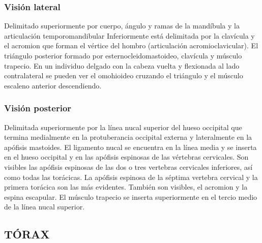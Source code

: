 \documentclass[a4paper,12pt]{article} %
\begin{document}
\begin{appendices}
\subsubsection{Visión lateral}
Delimitado superiormente por cuerpo, ángulo y ramas de la mandíbula y la articulación temporomandibular Inferiormente está delimitada por la clavícula y el acromion que forman el vértice del hombro (articulación acromioclavicular).
El triángulo posterior formado por esternocleidomastoideo, clavícula y músculo trapecio. En un individuo delgado con la cabeza vuelta y flexionada al lado contralateral se pueden ver el omohioideo cruzando el triángulo y el músculo escaleno anterior descendiendo.

\subsubsection{Visión posterior}
Delimitada superiormente por la línea nucal superior del hueso occipital que termina medialmente en la protuberancia occipital externa y lateralmente en la apófisis mastoides.
El ligamento nucal se encuentra en la línea media y se inserta en el hueso occipital y en las apófisis espinosas de las vértebras cervicales. Son visibles las apófisis espinosas de las dos o tres vertebras cervicales inferiores, así como todas las torácicas. La apófisis espinosa de la séptima vertebra cervical  y la primera torácica son las más evidentes. También son visibles, el acromion y la espina escapular.
El músculo trapecio se inserta superiormente en el tercio medio de la línea nucal superior.


\subsection{TÓRAX}


\end{appendices}
\end{document}
